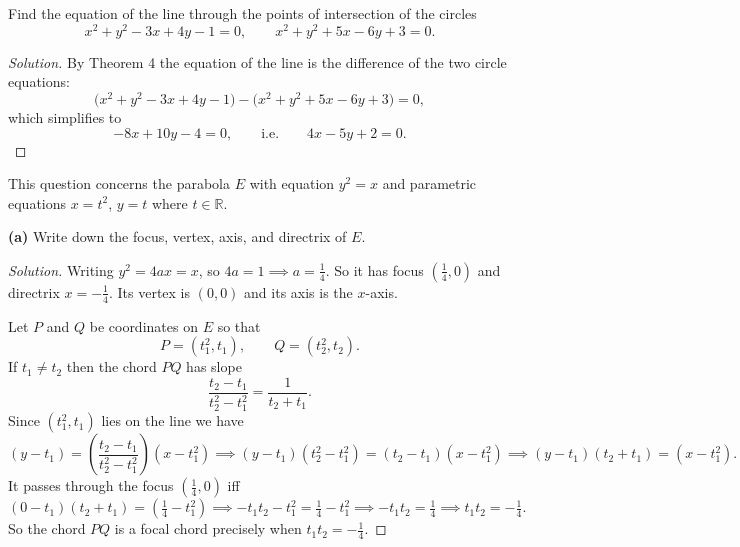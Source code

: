 \begin{tcolorbox}[title=Problem 6, breakable]
    Find the equation of the line through the points of intersection of the circles
    \[x^2 + y^2 - 3x + 4y - 1 = 0, \qquad x^2 + y^2 + 5x - 6y + 3 = 0.\]
\end{tcolorbox}
\begin{proof}[Solution]
    By Theorem 4 the equation of the line is the difference of the two circle equations:
    \[\bigl(x^2 + y^2 - 3x + 4y - 1\bigr) - \bigl(x^2 + y^2 + 5x - 6y + 3\bigr) = 0,\]
    which simplifies to
    \[-8x + 10y - 4 = 0, \qquad \text{i.e.} \qquad 4x - 5y + 2 = 0.\]
\end{proof}

\begin{tcolorbox}[title=Problem 7, breakable]
    This question concerns the parabola $E$ with equation $y^2 = x$ and parametric equations
    $x = t^2$, $y = t$ where $t \in \mathbb{R}$.

    \textbf{(a)} Write down the focus, vertex, axis, and directrix of $E$.
\end{tcolorbox}
\begin{proof}[Solution]
    Writing $y^2 = 4ax = x$, so $4a = 1 \implies a = \tfrac{1}{4}$.
    So it has focus $\left(\tfrac{1}{4}, 0\right)$ and directrix $x = -\tfrac{1}{4}$.
    Its vertex is $(0,0)$ and its axis is the $x$-axis.

    \medskip
    Let $P$ and $Q$ be coordinates on $E$ so that
    \[P = (t_1^2, t_1), \qquad Q = (t_2^2, t_2).\]
    If $t_1 \neq t_2$ then the chord $PQ$ has slope
    \[\frac{t_2 - t_1}{t_2^2 - t_1^2} = \frac{1}{t_2 + t_1}.\]
    Since $(t_1^2, t_1)$ lies on the line we have
    \[(y - t_1) = \left(\frac{t_2 - t_1}{t_2^2 - t_1^2}\right)(x - t_1^2)
    \implies (y - t_1)(t_2^2 - t_1^2) = (t_2 - t_1)(x - t_1^2)
    \implies (y - t_1)(t_2 + t_1) = (x - t_1^2).\]
    It passes through the focus $\left(\tfrac{1}{4}, 0\right)$ iff
    \[(0 - t_1)(t_2 + t_1) = \left(\tfrac{1}{4} - t_1^2\right)
    \implies -t_1 t_2 - t_1^2 = \tfrac{1}{4} - t_1^2
    \implies -t_1 t_2 = \tfrac{1}{4}
    \implies t_1 t_2 = -\tfrac{1}{4}.\]
    So the chord $PQ$ is a focal chord precisely when $t_1 t_2 = -\tfrac{1}{4}$.
\end{proof}

